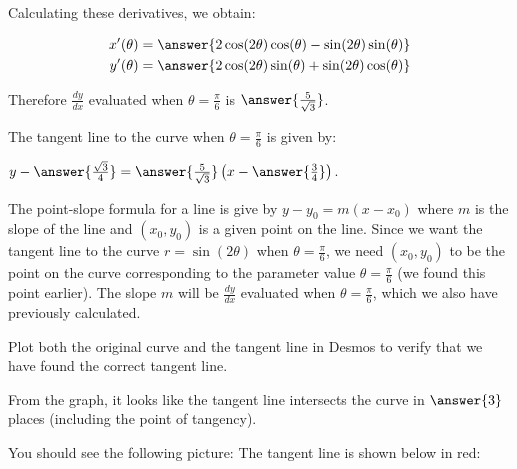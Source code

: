 \documentclass{ximera}
\begin{document}
\begin{exercise}
\begin{exercise}
\begin{hint}
Calculating these derivatives, we obtain:

\begin{align*}
x'(\theta)&=\answer{ 2\cos(2\theta)\cos(\theta)- \sin(2\theta)\sin(\theta)} \\
y'(\theta)&=\answer{ 2\cos(2\theta)\sin(\theta)+\sin(2\theta)\cos(\theta) }
\end{align*} 

Therefore $\frac{dy}{dx}$ evaluated when $\theta=\frac{\pi}{6}$ is $\answer{ \frac{5}{\sqrt{3}}  }$.


\end{hint}

\begin{exercise}

The tangent line to the curve when $\theta=\frac{\pi}{6}$ is given by: 

$y-\answer{\frac{\sqrt{3}}{4}   }=\answer{ \frac{5}{\sqrt{3}}  }\left( x- \answer{  \frac{3}{4} }  \right)$. 

\begin{hint}


The point-slope formula for a line is give by $y-y_0=m (x-x_0)$ where $m$ is the slope of the line and $(x_{0},y_{0})$ is a given point on the line. 
Since we want the tangent line to the curve $r=\sin(2\theta)$ when $\theta=\frac{\pi}{6}$, we need $(x_{0},y_{0})$ to be the point on the curve corresponding to the parameter value $\theta=\frac{\pi}{6}$ (we found this point earlier). The slope $m$ will be $\frac{dy}{dx}$ evaluated when $\theta=\frac{\pi}{6}$, which we also have previously calculated. 

\end{hint}

\begin{exercise}
Plot both the original curve and the tangent line in Desmos to verify that we have found the correct tangent line.  

From the graph, it looks like the tangent line intersects the curve in $\answer{3}$ places (including the point of tangency).


\begin{hint}
You should see the following picture:
The tangent line is shown below in red:


\end{hint}
\end{exercise}
\end{exercise}
\end{exercise}
\end{exercise}
\end{document}

